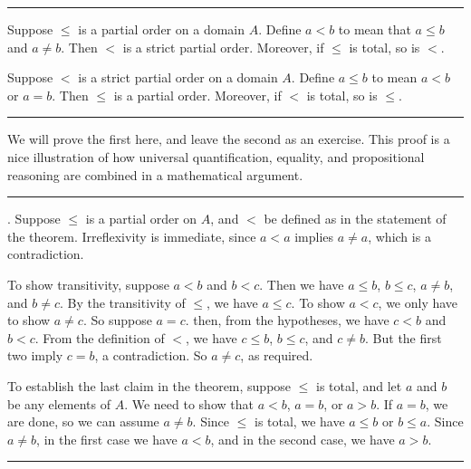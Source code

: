 \documentclass[letterpaper,10pt,english]{sphinxmanual}
\begin{document}
\bigskip\hrule\bigskip


\sphinxAtStartPar
{} Suppose \(\leq\) is a partial order on a domain \(A\). Define \(a < b\) to mean that \(a \leq b\) and \(a \neq b\). Then \(<\) is a strict partial order. Moreover, if \(\leq\) is total, so is \(<\).

\sphinxAtStartPar
{} Suppose \(<\) is a strict partial order on a domain \(A\). Define \(a \leq b\) to mean \(a < b\) or \(a = b\). Then \(\leq\) is a partial order. Moreover, if \(<\) is total, so is \(\leq\).


\bigskip\hrule\bigskip


\sphinxAtStartPar
We will prove the first here, and leave the second as an exercise. This proof is a nice illustration of how universal quantification, equality, and propositional reasoning are combined in a mathematical argument.


\bigskip\hrule\bigskip


\sphinxAtStartPar
{}. Suppose \(\leq\) is a partial order on \(A\), and \(<\) be defined as in the statement of the theorem. Irreflexivity is immediate, since \(a < a\) implies \(a \neq a\), which is a contradiction.

\sphinxAtStartPar
To show transitivity, suppose \(a < b\) and \(b < c\). Then we have \(a \leq b\), \(b \leq c\), \(a \neq b\), and \(b \neq c\). By the transitivity of \(\leq\), we have \(a \leq c\). To show \(a < c\), we only have to show \(a \neq c\). So suppose \(a = c\). then, from the hypotheses, we have \(c < b\) and \(b < c\). From the definition of \(<\), we have \(c \leq b\), \(b \leq c\), and \(c \neq b\). But the first two imply \(c = b\), a contradiction. So \(a \neq c\), as required.

\sphinxAtStartPar
To establish the last claim in the theorem, suppose \(\leq\) is total, and let \(a\) and \(b\) be any elements of \(A\). We need to show that \(a < b\), \(a = b\), or \(a > b\). If \(a = b\), we are done, so we can assume \(a \neq b\). Since \(\leq\) is total, we have \(a \leq b\) or \(b \leq a\). Since \(a \neq b\), in the first case we have \(a < b\), and in the second case, we have \(a > b\).


\bigskip\hrule\bigskip
\end{document}

